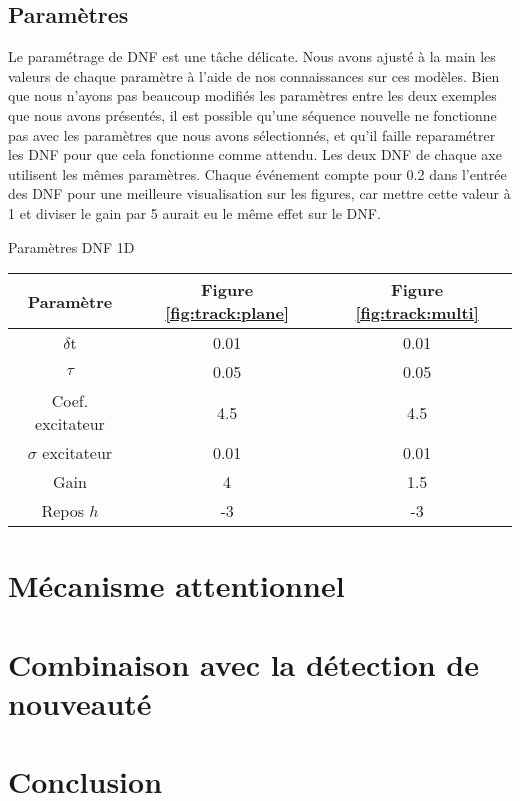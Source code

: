 	\subsection{Paramètres}

	Le paramétrage de DNF est une tâche délicate. Nous avons ajusté à la main les valeurs de chaque paramètre à l'aide de nos connaissances sur ces modèles. Bien que nous n'ayons pas beaucoup modifiés les paramètres entre les deux exemples que nous avons présentés, il est possible qu'une séquence nouvelle ne fonctionne pas avec les paramètres que nous avons sélectionnés, et qu'il faille reparamétrer les DNF pour que cela fonctionne comme attendu. Les deux DNF de chaque axe utilisent les mêmes paramètres. Chaque événement compte pour 0.2 dans l'entrée des DNF pour une meilleure visualisation sur les figures, car mettre cette valeur à 1 et diviser le gain par 5 aurait eu le même effet sur le DNF.


	\begin{tableth}
	\label{tab:recap:param}
	\caption[Paramètres DNF 1D]{Paramètres DNF 1D}
	\begin{tabular}{|c|cc|}
		\hline
		Paramètre & Figure \ref{fig:track:plane} & Figure \ref{fig:track:multi}\\
		\hline
		$\delta$t & 0.01 & 0.01\\
		$\tau$ & 0.05 & 0.05\\
		Coef. excitateur & 4.5 & 4.5\\
		$\sigma$ excitateur & 0.01 & 0.01\\
		Gain & 4 & 1.5\\
		Repos $h$ & -3 & -3\\
		\hline
	\end{tabular}
	\end{tableth}

	\newpage

	\section{Mécanisme attentionnel}
	\section{Combinaison avec la détection de nouveauté}
	\section{Conclusion}
		


